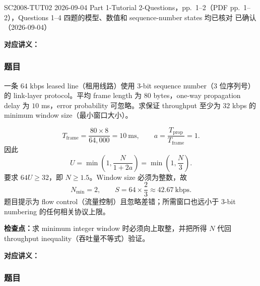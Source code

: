 
\label{tutorial:SC2008-TUT02}

\tutorialmeta
  {SC2008-TUT02}
  {2026-09-04}
  {Part 1-Tutorial 2-Questions，pp.~1--2（PDF pp.~1--2），Questions 1--4}
  {四题的模型、数值和 sequence-number states 均已核对}
  {已确认（2026-09-04）}


\textbf{对应讲义：}

\subsubsection*{题目}

一条 $64$ kbps leased line（租用线路）使用 3-bit sequence number（3 位序列号）的 link-layer protocol。平均 frame length 为 $80$ bytes，one-way propagation delay 为 $10$ ms，error probability 可忽略。求保证 throughput 至少为 $32$ kbps 的 minimum window size（最小窗口大小）。

\begin{checkedsolution}
\[
  T_{\mathrm{frame}}=\frac{80\times8}{64{,}000}=10\ \mathrm{ms},
  \qquad
  a=\frac{T_{\mathrm{prop}}}{T_{\mathrm{frame}}}=1.
\]
因此
\[
  U=\min\!\left(1,\frac{N}{1+2a}\right)
   =\min\!\left(1,\frac N3\right).
\]
要求 $64U\ge32$，即 $N\ge1.5$。Window size 必须为整数，故
\[
  \boxed{N_{\min}=2},
  \qquad
  S=64\times\frac23\approx\boxed{42.67\ \mathrm{kbps}}.
\]
题目提示为 flow control（流量控制）且忽略差错；所需窗口也远小于 3-bit numbering 的任何相关协议上限。
\end{checkedsolution}

\textbf{检查点：}求 minimum integer window 时必须向上取整，并把所得 $N$ 代回 throughput inequality（吞吐量不等式）验证。


\textbf{对应讲义：}

\subsubsection*{题目}

